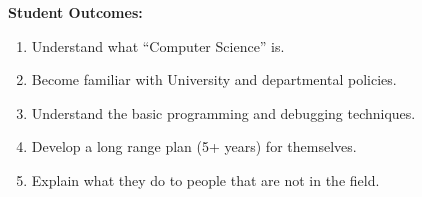 
    \item {\bf Student Outcomes:}  
      \begin{enumerate}[label=\arabic*.]
      \item Understand what ``Computer Science'' is.
        
      \item Become familiar with University and departmental policies. 
        
      \item Understand the basic programming and debugging techniques.
        
      \item  Develop a long range plan (5+ years) for themselves.

      \item  Explain what they do to people that are not in the field.

      \end{enumerate}
